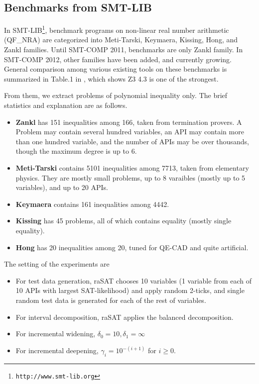 \documentclass[runningheads,a4paper,oribibl]{llncs}
\begin{document}
\subsection{Benchmarks from SMT-LIB} \label{sec:expsmtlib}

In SMT-LIB\footnote{\tt http://www.smt-lib.org}, 
benchmark programs on non-linear real number arithmetic 
(QF\_NRA) are categorized into Meti-Tarski, Keymaera, Kissing, Hong, and Zankl families. 
Until SMT-COMP 2011, benchmarks are only Zankl family. 
In SMT-COMP 2012, other families have been added, and currently growing. 
General comparison among various existing tools on these benchmarks is summarized in 
Table.1 in \cite{Jovanovic13}, which shows Z3 4.3 is one of the strongest. 

From them, we extract problems of polynomial inequality only. %
The brief statistics and explanation are as follows. 
\begin{itemize}
\item {\bf Zankl} has 151 inequalities among 166, taken from termination provers. 
A Problem may contain several hundred variables, an API may contain more than one hundred variable, 
and the number of APIs may be over thousands, though the maximum degree is up to $6$. 
\item {\bf Meti-Tarski} contains 5101 inequalities among 7713, taken from elementary physics.
They are mostly small problems, up to 8 varaibles (mostly up to 5 variables), and up to 20 APIs. 
\item {\bf Keymaera} contains 161 inequalities among 4442. 
\item {\bf Kissing} has 45 problems, all of which contains equality (mostly single equality). 
\item {\bf Hong} has 20 inequalities among 20, tuned for QE-CAD and quite artificial. 
\end{itemize}


The setting of the experiments are
\begin{itemize}
\item For test data generation, raSAT chooses 10 variables (1 variable from each of 10 APIs with largest SAT-likelihood) and apply random 2-ticks, and single random test data is generated for each of the rest of variables.
\item For interval decomposition, raSAT applies the balanced decomposition.
\item For incremental widening, $\delta_0 = 10, \delta_1 = \infty$
\item For incremental deepening, $\gamma_i = 10^{-(i+1)}$ for $i \ge 0$.
\end{itemize}
\end{document}
